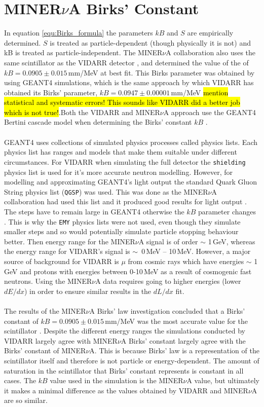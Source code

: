 \section{MINER$\nu$A Birks' Constant}\label{sec:GEANT4Simulation_MINERvABirksConstant}
In equation \ref{equ:Birks_formula} the parameters $kB$ and $S$ are empirically determined. $S$ is treated as particle-dependent (though physically it is not) and kB is treated as particle-independent. The MINER$\nu$A collaboration \cite{aliaga_2015} also uses the same scintillator as the VIDARR detector \cite{aliaga_2014}, and determined the value of the of $kB = 0.0905 \pm 0.015$\,mm/MeV at best fit. This Birks parameter was obtained by using GEANT4 simulations, which is the same approach by which VIDARR has obtained its Birks' parameter, $kB = 0.0947 \pm 0.00001$\,mm/MeV \hl{mention statistical and systematic errors! This sounds like VIDARR did a better job which is not true!}.Both the VIDARR and MINER$\nu$A approach use the GEANT4 Bertini cascade model when determining the Birks' constant $kB$ \cite{Heikkinen_2003}. 
\\\\GEANT4 uses collections of simulated physics processes called physics lists. Each physics list has ranges and models that make them suitable under different circumstances. For VIDARR when simulating the full detector the \texttt{shielding} physics list is used for it's more accurate neutron modelling. However, for modelling and approximating GEANT4's light output the standard Quark Gluon String physics list (\texttt{QGSP}) was used. This was done as the MINER$\nu$A collaboration had used this list and it produced good results for light output \cite{Patrick_2018}. The steps have to remain large in GEANT4 otherwise the $kB$ parameter changes \cite{aliaga_2015}. This is why the \texttt{EMY} physics lists were not used, even though they simulate smaller steps and so would potentially simulate particle stopping behaviour better. Then energy range for the MINER$\nu$A signal is of order $\sim$ 1\,GeV, whereas the energy range for VIDARR's signal is $\sim$~0\,MeV -- 10\,MeV. However, a major source of background for VIDARR is $\mu$ from cosmic rays which have energies $\sim$ 1\,GeV and protons with energies between 0-10\,MeV as a result of cosmogenic fast neutrons. Using the MINER$\nu$A data requires going to higher energies (lower $dE/dx$) in order to ensure similar results in the $dL/dx$ fit.  
\\\\The results of the MINER$\nu$A Birks' law investigation concluded that a Birks' constant of $kB = 0.0905 \pm 0.015$\,mm/MeV was the most accurate value for the scintillator \cite{aliaga_2015}. Despite the different energy ranges the simulations conducted by VIDARR largely agree with MINER$\nu$A Birks' constant largely agree with the Birks' constant of MINER$\nu$A. This is because Birks' law is a representation of the scintillator itself and therefore is not particle or energy-dependent. The amount of saturation in the scintillator that Birks' constant represents is constant in all cases. The $kB$ value used in the simulation is the MINER$\nu$A value, but ultimately it makes a minimal difference as the values obtained by VIDARR and MINER$\nu$A are so similar. 
